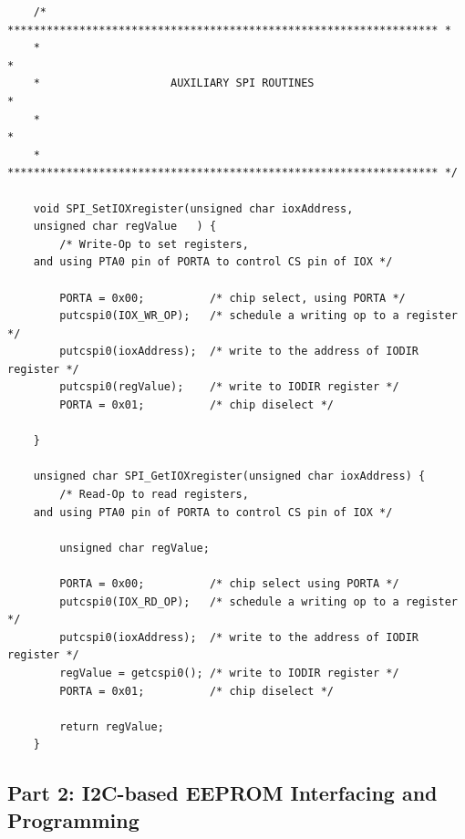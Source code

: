 \documentclass{article}
\begin{document}
\begin{lstlisting}
	/* ****************************************************************** *
	*                                                                    *
	*                    AUXILIARY SPI ROUTINES                          *
	*                                                                    *
	* ****************************************************************** */
	
	void SPI_SetIOXregister(unsigned char ioxAddress,
	unsigned char regValue   ) {
		/* Write-Op to set registers,
	and using PTA0 pin of PORTA to control CS pin of IOX */
	
		PORTA = 0x00;          /* chip select, using PORTA */
		putcspi0(IOX_WR_OP);   /* schedule a writing op to a register */
		putcspi0(ioxAddress);  /* write to the address of IODIR register */
		putcspi0(regValue);    /* write to IODIR register */  
		PORTA = 0x01;          /* chip diselect */
	
	}
	
	unsigned char SPI_GetIOXregister(unsigned char ioxAddress) {
		/* Read-Op to read registers,
	and using PTA0 pin of PORTA to control CS pin of IOX */
	
		unsigned char regValue;
	
		PORTA = 0x00;          /* chip select using PORTA */
		putcspi0(IOX_RD_OP);   /* schedule a writing op to a register */
		putcspi0(ioxAddress);  /* write to the address of IODIR 	register */
		regValue = getcspi0(); /* write to IODIR register */  
		PORTA = 0x01;          /* chip diselect */
	
		return regValue;
	}
	\end{lstlisting}
	\subsection*{Part 2: I2C-based EEPROM Interfacing and Programming}
\end{document}
